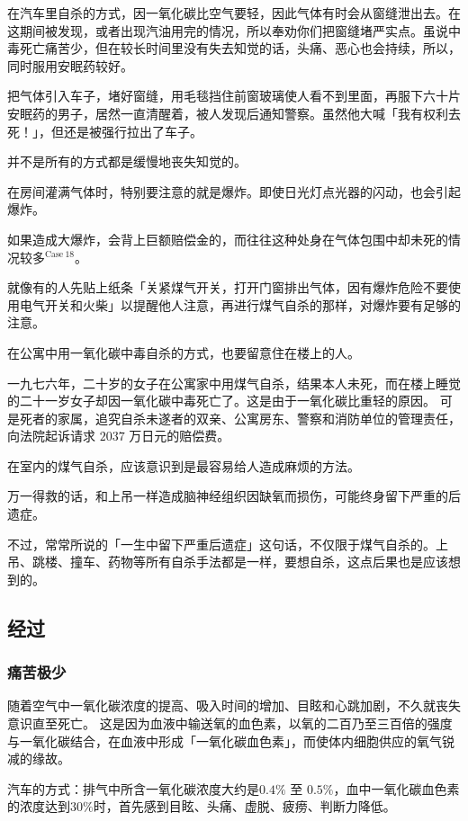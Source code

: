 \documentclass[UTF8]{ctexart}
\begin{document}
在汽车里自杀的方式，因一氧化碳比空气要轻，因此气体有时会从窗缝泄出去。在这期间被发现，或者出现汽油用完的情况，所以奉劝你们把窗缝堵严实点。虽说中毒死亡痛苦少，但在较长时间里没有失去知觉的话，头痛、恶心也会持续，所以，同时服用安眠药较好。

把气体引入车子，堵好窗缝，用毛毯挡住前窗玻璃使人看不到里面，再服下六十片安眠药的男子，居然一直清醒着，被人发现后通知警察。虽然他大喊「我有权利去死！」，但还是被强行拉出了车子。

并不是所有的方式都是缓慢地丧失知觉的。 

在房间灌满气体时，特别要注意的就是爆炸。即使日光灯点光器的闪动，也会引起爆炸。

如果造成大爆炸，会背上巨额赔偿金的，而往往这种处身在气体包围中却未死的情况较多$^{\mathrm{Case\ 18}}$。

就像有的人先贴上纸条「关紧煤气开关，打开门窗排出气体，因有爆炸危险不要使用电气开关和火柴」以提醒他人注意，再进行煤气自杀的那样，对爆炸要有足够的注意。

在公寓中用一氧化碳中毒自杀的方式，也要留意住在楼上的人。

一九七六年，二十岁的女子在公寓家中用煤气自杀，结果本人未死，而在楼上睡觉的二十一岁女子却因一氧化碳中毒死亡了。这是由于一氧化碳比重轻的原因。
可是死者的家属，追究自杀未遂者的双亲、公寓房东、警察和消防单位的管理责任，向法院起诉请求 $2037$ 万日元的赔偿费。

在室内的煤气自杀，应该意识到是最容易给人造成麻烦的方法。

万一得救的话，和上吊一样造成脑神经组织因缺氧而损伤，可能终身留下严重的后遗症。

不过，常常所说的「一生中留下严重后遗症」这句话，不仅限于煤气自杀的。上吊、跳楼、撞车、药物等所有自杀手法都是一样，要想自杀，这点后果也是应该想到的。


\subsection{经过}

\subsubsection*{痛苦极少}

随着空气中一氧化碳浓度的提高、吸入时间的增加、目眩和心跳加剧，不久就丧失意识直至死亡。
这是因为血液中输送氧的血色素，以氧的二百乃至三百倍的强度与一氧化碳结合，在血液中形成「一氧化碳血色素」，而使体内细胞供应的氧气锐减的缘故。

汽车的方式：排气中所含一氧化碳浓度大约是$0.4\%$ 至 $0.5\%$，血中一氧化碳血色素的浓度达到$30\%$时，首先感到目眩、头痛、虚脱、疲痨、判断力降低。
\end{document}
